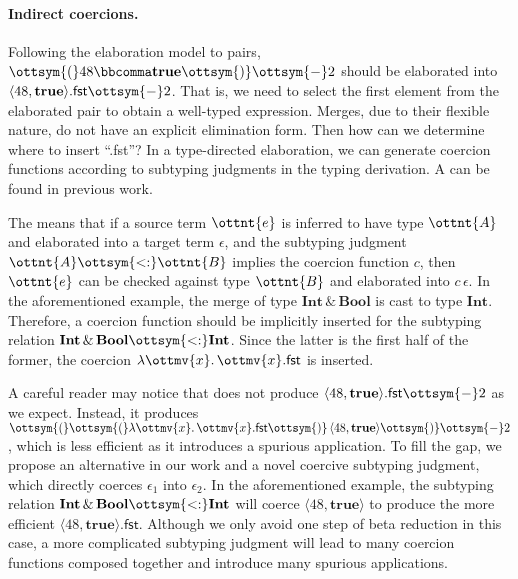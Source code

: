 \paragraph{Indirect coercions.} \label{sec:coercive}
Following the elaboration model to pairs, $\ottsym{(}  48  \bbcomma   \mathbf{true}   \ottsym{)}  \ottsym{-}  2$ should be
elaborated into $  \langle  48 ,   \mathbf{true}   \rangle   . \mathsf{fst}   \ottsym{-}  2$. That is, we need to select the first
element from the elaborated pair to obtain a well-typed expression. Merges, due
to their flexible nature, do not have an explicit elimination form. Then how can
we determine where to insert ``\textsf{.fst}''? In a type-directed elaboration,
we can generate coercion functions according to subtyping judgments in the
typing derivation. A  can be found in previous work.
\begin{mathpar}
\end{mathpar}
The  means that if a source term $\ottnt{e}$ is inferred to have type
$\ottnt{A}$ and elaborated into a target term $\epsilon$, and the subtyping judgment
$ \ottnt{A}   \ottsym{<:}   \ottnt{B} $ implies the coercion function $c$, then $\ottnt{e}$ can be checked
against type $\ottnt{B}$ and elaborated into $ c\, \epsilon $. In the aforementioned
example, the merge of type $ \mathbf{Int}   \, {\&} \,   \mathbf{Bool} $ is cast to type $ \mathbf{Int} $. Therefore,
a coercion function should be implicitly inserted for the subtyping relation
$  \mathbf{Int}   \, {\&} \,   \mathbf{Bool}    \ottsym{<:}    \mathbf{Int}  $. Since the latter is the first half of the former, the
coercion $  \lambda \ottmv{x} .\, \ottmv{x}   . \mathsf{fst} $ is inserted.

A careful reader may notice that  does not produce
$  \langle  48 ,   \mathbf{true}   \rangle   . \mathsf{fst}   \ottsym{-}  2$ as we expect. Instead, it produces
$\ottsym{(}  \ottsym{(}    \lambda \ottmv{x} .\, \ottmv{x}   . \mathsf{fst}   \ottsym{)} \,  \langle  48 ,   \mathbf{true}   \rangle   \ottsym{)}  \ottsym{-}  2$, which is less efficient as it introduces a
spurious application. To fill the gap, we propose an alternative 
in our work and a novel coercive subtyping judgment, which directly coerces
$\epsilon_{{\mathrm{1}}}$ into $\epsilon_{{\mathrm{2}}}$. In the aforementioned example, the subtyping relation
$  \mathbf{Int}   \, {\&} \,   \mathbf{Bool}    \ottsym{<:}    \mathbf{Int}  $ will coerce $ \langle  48 ,   \mathbf{true}   \rangle $ to produce the more efficient
$  \langle  48 ,   \mathbf{true}   \rangle   . \mathsf{fst} $. Although we only avoid one step of beta reduction in this
case, a more complicated subtyping judgment will lead to many coercion functions
composed together and introduce many spurious applications.

